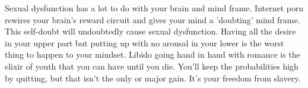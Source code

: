 \documentclass[easypeasy]{subfiles}
\begin{document}
Sexual dysfunction has a lot to do with your brain and mind frame. Internet porn rewires your brain's reward circuit and gives your mind a 'doubting' mind frame. This self-doubt will undoubtedly cause sexual dysfunction. Having all the desire in your upper part but putting up with no arousal in your lower is the worst thing to happen to your mindset. Libido going hand in hand with romance is the elixir of youth that you can have until you die. You'll keep the probabilities high by quitting, but that isn't the only or major gain. It's your freedom from slavery.
\end{document}
